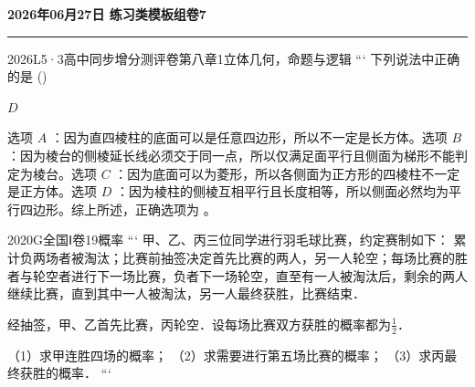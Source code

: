 \documentclass[12pt,UTF-8,a4paper]{ctexart}
\newcommand{\mytitle}{}
\numberwithin{figure}{section}
\theoremstyle{mystyle}
\theoremstyle{mystylekaishu}
\theoremstyle{mystyle}
\numberwithin{xiti}{section}
\begin{document}
\thispagestyle{plain} %
\renewcommand{\mytitle}{2026年06月27日 练习类模板组卷7}

\begin{center}
  {\Huge\bfseries\color{structure} \mytitle}
  \vspace{0.5em}
  
  \textcolor{structure}{\rule{\linewidth}{1.5pt}}
\end{center}
\vspace{1em}


\begin{problem}{2026}{L}{5·3高中同步增分测评卷第八章}{1}{立体几何，命题与逻辑}
```
下列说法中正确的是 (\hspace{1cm})
\begin{choices}
\end{choices}
\end{problem}

\begin{answer}
$D$
\end{answer}

\begin{solutions}
选项 $A$ ：因为直四棱柱的底面可以是任意四边形，所以不一定是长方体。选项 $B$ ：因为棱台的侧棱延长线必须交于同一点，所以仅满足面平行且侧面为梯形不能判定为棱台。选项 $C$ ：因为底面可以为菱形，所以各侧面为正方形的四棱柱不一定是正方体。选项 $D$ ：因为棱柱的侧棱互相平行且长度相等，所以侧面必然均为平行四边形。综上所述，正确选项为 。
\end{solutions}


\begin{problem}{2020}{G}{全国Ⅰ卷}{19}{概率}
```
甲、乙、丙三位同学进行羽毛球比赛，约定赛制如下：  
累计负两场者被淘汰；比赛前抽签决定首先比赛的两人，另一人轮空；每场比赛的胜者与轮空者进行下一场比赛，负者下一场轮空，直至有一人被淘汰后，剩余的两人继续比赛，直到其中一人被淘汰，另一人最终获胜，比赛结束．  

经抽签，甲、乙首先比赛，丙轮空．设每场比赛双方获胜的概率都为$\frac{1}{2}$．  

（1）求甲连胜四场的概率；  
（2）求需要进行第五场比赛的概率；  
（3）求丙最终获胜的概率．
```
\end{problem}
\end{document}
